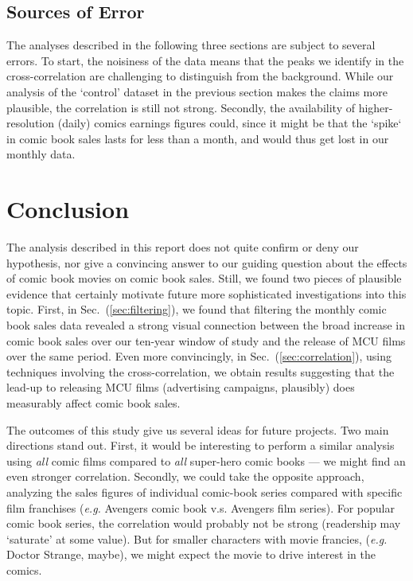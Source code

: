 \documentclass[12pt]{article}
\begin{document}
\subsection{Sources of Error}
\label{sec:sources_of_error}
The analyses described in the following three sections are subject to several errors.  To start, the noisiness of the data means that the peaks we identify in the cross-correlation are challenging to distinguish from the background.  While our analysis of the `control' dataset in the previous section makes the claims more plausible, the correlation is still not strong.  Secondly, the availability of higher-resolution (daily) comics earnings figures could, since it might be that the `spike` in comic book sales lasts for less than a month, and would thus get lost in our monthly data.



\section{Conclusion}
The analysis described in this report does not quite confirm or deny our hypothesis, nor give a convincing answer to our guiding question about the effects of comic book movies on comic book sales.  Still, we found two pieces of plausible evidence that certainly motivate future more sophisticated investigations into this topic.  First, in Sec.~(\ref{sec:filtering}), we found that filtering the monthly comic book sales data revealed a strong visual connection between the broad increase in comic book sales over our ten-year window of study and the release of MCU films over the same period.  Even more convincingly, in Sec.~(\ref{sec:correlation}), using techniques involving the cross-correlation, we obtain results suggesting that the lead-up to releasing MCU films (advertising campaigns, plausibly) does measurably affect comic book sales.

The outcomes of this study give us several ideas for future projects.  Two main directions stand out.  First, it would be interesting to perform a similar analysis using \textit{all} comic films compared to \textit{all} super-hero comic books --- we might find an even stronger correlation.  Secondly, we could take the opposite approach, analyzing the sales figures of individual comic-book series compared with specific film franchises (\textit{e.g.} Avengers comic book v.s. Avengers film series).  For popular comic book series, the correlation would probably not be strong (readership may `saturate' at some value). But for smaller characters with movie francies, (\textit{e.g.} Doctor Strange, maybe), we might expect the movie to drive interest in the comics.
\end{document}
